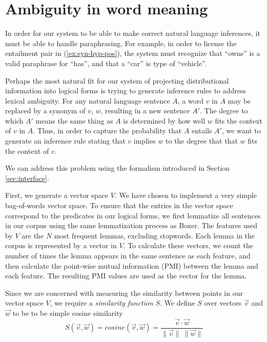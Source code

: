 \section{Ambiguity in word meaning}

In order for our system to be able to make correct natural language inferences,
it must be able to handle paraphrasing.  For example, in order to license the
entailment pair in (\ref{ex:syn-hyp-pos}), the system must recognize that
``owns'' is a valid paraphrase for ``has'', and that a ``car'' is type of
``vehicle''.


Perhaps the most natural fit for our system of projecting distributional
information into logical forms is trying to generate inference rules to address
lexical ambiguity.  For any natural language sentence $A$, a word $v$ in $A$ may
be replaced by a synonym of $v$, $w$, resulting in a new sentence $A'$.  The
degree to which $A'$ means the same thing as $A$ is determined by how well $w$
fits the context of $v$ in $A$.  Thus, in order to capture the probability that
$A$ entails $A'$, we want to generate an inference rule stating that $v$ implies
$w$ to the degree that that $w$ fits the context of $v$.

We can address this problem using the formalism introduced in
Section \ref{sec:interface}.

First, we generate a vector space $V$.  We have chosen to implement a very
simple bag-of-words vector space.  To ensure that the entries in the vector
space correspond to the predicates in our logical forms, we first lemmatize all
sentences in our corpus using the same lemmatization process as Boxer.
The features used by $V$ are the $N$ most frequent lemmas, excluding stopwords.  
Each lemma in the corpus is represented by a vector in $V$.  To calculate these
vectors, we count the number of times the lemma appears in the same sentence
as each feature, and then calculate the point-wise mutual information (PMI)
between the lemma and each feature.  The resulting PMI values are used as the 
vector for the lemma.

Since we are concerned with measuring the similarity between points in our
vector space $V$, we require a {\it similarity function} $S$.  We define $S$
over vectors $\vec v$ and $\vec w$ to be to be simple cosine similarity \[
S(\vec v, \vec w) = cosine(\vec v, \vec w) = \frac{\vec v \cdot \vec w}{\|\vec
v\|~\|\vec w\|}\]

